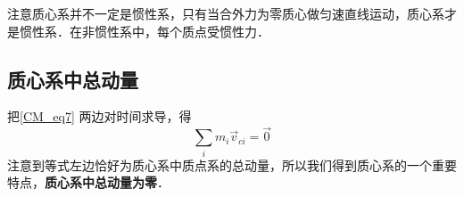注意质心系并不一定是惯性系，只有当合外力为零质心做匀速直线运动，质心系才是惯性系．在非惯性系中，每个质点受惯性力．

\subsection{质心系中总动量}
把\autoref{CM_eq7} 两边对时间求导，得
\begin{equation}\label{CM_eq8}
\sum\limits_i {{m_i}{{\vec v}_{ci}}} = \vec 0
\end{equation}
注意到等式左边恰好为质心系中质点系的总动量，所以我们得到质心系的一个重要特点，\textbf{质心系中总动量为零}．


 
